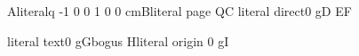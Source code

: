 \documentclass{article}
\begin{document}
A\pdfextension literal{q -1 0 0 1 0 0 cm}B\pdfextension literal page {Q}C
\pdfextension literal direct{0 g}D E\EndAccSupp{}F

\pdfextension literal text{0 g}G\pdfextension bogus H\pdfextension literal origin {0 g}I
\end{document}
